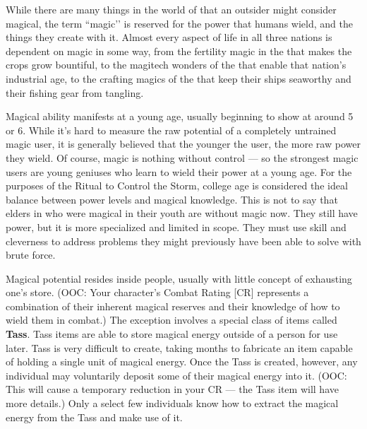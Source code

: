 \documentclass[blue]{GL2020}
\begin{document}
While there are many things in the world of \pEarth{} that an outsider might consider magical, the term ``magic'’ is reserved for the power that humans wield, and the things they create with it. Almost every aspect of life in all three nations is dependent on magic in some way, from the fertility magic in the \pFarm{} that makes the crops grow bountiful, to the magitech wonders of the \pTech{} that enable that nation's industrial age, to the crafting magics of the \pShippies{} that keep their ships seaworthy and their fishing gear from tangling.

Magical ability manifests at a young age, usually beginning to show at around 5 or 6. While it's hard to measure the raw potential of a completely untrained magic user, it is generally believed that the younger the user, the more raw power they wield. Of course, magic is nothing without control — so the strongest magic users are young geniuses who learn to wield their power at a young age. For the purposes of the Ritual to Control the Storm, college age is considered the ideal balance between power levels and magical knowledge. This is not to say that elders in \pEarth{} who were magical in their youth are without magic now. They still have power, but it is more specialized and limited in scope. They must use skill and cleverness to address problems they might previously have been able to solve with brute force.

Magical potential resides inside people, usually with little concept of exhausting one's store. (OOC: Your character's Combat Rating [CR] represents a combination of their inherent magical reserves and their knowledge of how to wield them in combat.) The exception involves a special class of items called \textbf{Tass}. Tass items are able to store magical energy outside of a person for use later. Tass is very difficult to create, taking months to fabricate an item capable of holding a single unit of magical energy. Once the Tass is created, however, any individual may voluntarily deposit some of their magical energy into it. (OOC: This will cause a temporary reduction in your CR — the Tass item will have more details.) Only a select few individuals know how to extract the magical energy from the Tass and make use of it.
\end{document}
